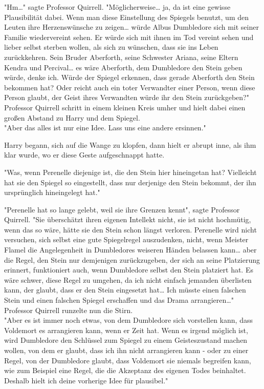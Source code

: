 {"Hm…" sagte Professor Quirrell. "Möglicherweise… ja, da ist eine gewisse Plausibilität dabei. Wenn man diese Einstellung des Spiegels benutzt, um den Leuten ihre Herzenswünsche zu zeigen… würde Albus Dumbledore sich mit seiner Familie wiedervereint sehen. Er würde sich mit ihnen im Tod vereint sehen und lieber selbst sterben wollen, als sich zu wünschen, dass sie ins Leben zurückkehren. Sein Bruder Aberforth, seine Schwester Ariana, seine Eltern Kendra und Percival… es wäre Aberforth, dem Dumbledore den Stein geben würde, denke ich. Würde der Spiegel erkennen, dass gerade Aberforth den Stein bekommen hat? Oder reicht auch ein toter Verwandter einer Person, wenn diese Person glaubt, der Geist ihres Verwandten würde ihr den Stein zurückgeben?"\\ Professor Quirrell schritt in einem kleinen Kreis umher und hielt dabei einen großen Abstand zu Harry und dem Spiegel.\\ "Aber das alles ist nur eine Idee. Lass uns eine andere ersinnen."

Harry begann, sich auf die Wange zu klopfen, dann hielt er abrupt inne, als ihm klar wurde, wo er diese Geste aufgeschnappt hatte.

"Was, wenn Perenelle diejenige ist, die den Stein hier hineingetan hat? Vielleicht hat sie den Spiegel so eingestellt, dass nur derjenige den Stein bekommt, der ihn ursprünglich hineingelegt hat."

"Perenelle hat so lange gelebt, weil sie ihre Grenzen kennt", sagte Professor Quirrell. "Sie überschätzt ihren eigenen Intellekt nicht, sie ist nicht hochmütig, wenn das so wäre, hätte sie den Stein schon längst verloren. Perenelle wird nicht versuchen, sich selbst eine gute Spiegelregel auszudenken, nicht, wenn Meister Flamel die Angelegenheit in Dumbledores weiseren Händen belassen kann… aber die Regel, den Stein nur demjenigen zurückzugeben, der sich an seine Platzierung erinnert, funktioniert auch, wenn Dumbledore selbst den Stein platziert hat. Es wäre schwer, diese Regel zu umgehen, da ich nicht einfach jemanden überlisten kann, der glaubt, dass er den Stein eingesetzt hat… Ich müsste einen falschen Stein und einen falschen Spiegel erschaffen und das Drama arrangieren…"\\ Professor Quirrell runzelte nun die Stirn.\\ "Aber es ist immer noch etwas, von dem Dumbledore sich vorstellen kann, dass Voldemort es arrangieren kann, wenn er Zeit hat. Wenn es irgend möglich ist, wird Dumbledore den Schlüssel zum Spiegel zu einem Geisteszustand machen wollen, von dem er glaubt, dass ich ihn nicht arrangieren kann - oder zu einer Regel, von der Dumbledore glaubt, dass Voldemort sie niemals begreifen kann, wie zum Beispiel eine Regel, die die Akzeptanz des eigenen Todes beinhaltet. Deshalb hielt ich deine vorherige Idee für plausibel."

}
